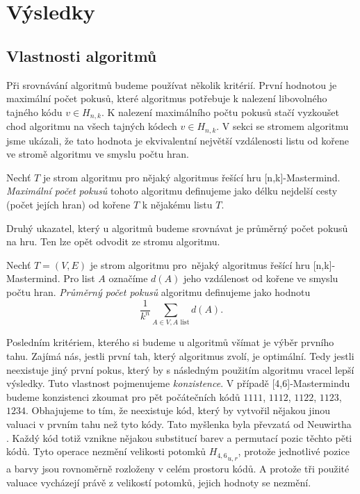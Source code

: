 \chapter{Výsledky}

\section{Vlastnosti algoritmů}
Při srovnávání algoritmů budeme používat několik kritérií. První hodnotou je maximální počet pokusů, které algoritmus potřebuje k nalezení libovolného tajného kódu $v \in H_{n,k}$. K nalezení maximálního počtu pokusů stačí vyzkoušet chod algoritmu na všech tajných kódech $v \in H_{n,k}$. V sekci se stromem algoritmu jsme ukázali, že tato hodnota je ekvivalentní největší vzdálenosti listu od kořene ve stromě algoritmu ve smyslu počtu hran.

\begin{definice}\label{defmaxpocetpokusu}
    Nechť $T$ je strom algoritmu pro nějaký algoritmus řešící hru [n,k]-Mastermind. \emph{Maximální počet pokusů} tohoto algoritmu definujeme jako délku nejdelší cesty (počet jejích hran) od kořene $T$ k nějakému listu $T$. 
\end{definice}

Druhý ukazatel, který u algoritmů budeme srovnávat je průměrný počet pokusů na hru. Ten lze opět odvodit ze stromu algoritmu.

\begin{definice}\label{defprumpocetpokusu}
    Nechť $T = (V,E)$ je strom algoritmu pro~nějaký algoritmus řešící hru [n,k]-Mastermind. Pro list $A$ označíme $d(A)$ jeho vzdálenost od kořene ve smyslu počtu hran. \emph{Průměrný počet pokusů} algoritmu definujeme jako hodnotu
    \[\frac{1}{k^n}\sum_{A\in V, A \text{ list}} d(A).\]
\end{definice}

Posledním kritériem, kterého si budeme u algoritmů všímat je výběr prvního tahu. Zajímá nás, jestli první tah, který algoritmus zvolí, je optimální. Tedy jestli neexistuje jiný první pokus, který by s následným použitím algoritmu vracel lepší výsledky. Tuto vlastnost pojmenujeme \emph{konzistence}. V případě [4,6]-Mastermindu budeme konzistenci zkoumat pro pět počátečních kódů $1111$, $1112$, $1122$, $1123$, $1234$. Obhajujeme to tím, že neexistuje kód, který by vytvořil nějakou jinou valuaci v prvním tahu než tyto kódy. Tato myšlenka byla převzatá od Neuwirtha \cite{neuwirth}. Každý kód totiž vznikne nějakou substitucí barev a permutací pozic těchto pěti kódů. Tyto operace nezmění velikosti potomků ${H_{4,6}}_{u,r}$, protože jednotlivé pozice a barvy jsou rovnoměrně rozloženy v celém prostoru kódů. A protože tři použité valuace vycházejí právě z velikostí potomků, jejich hodnoty se nezmění. 


